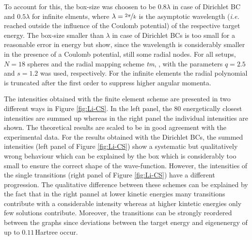 To account for this, the box-size was choosen to be $0.8\lambda$ in case of Dirichlet BC and $0.5\lambda$ for infinite elments, where $\lambda=\nicefrac{2\pi}{k}$ is the asymptotic wavelength (\textit{i.e.} reached outside the influence of the Coulomb potential) of the respective target energy.
The box-size smaller than $\lambda$ in case of Dirichlet BCs is too small for a reasonable error in energy but show, since the wavelength is considerably smaller in the presence of a Coulomb potential, still some radial nodes.
For all setups, $N=18$ spheres and the radial mapping scheme \textit{tm}, , with the parameters $q=2.5$ and $s=1.2$ was used, respectively.
For the infinite elements the radial polynomial is truncated after the first order to suppress higher angular momenta.

The intensities obtained with the finite element scheme are presented in two different ways in Figure \ref{fig:Li-CS}.
In the left panel, the $80$ energetically closest intensities are summed up whereas in the right panel the individual intensities are shown.
The theoretical results are scaled to be in good agreement with the experimental data.
For the results obtained with the Dirichlet BCs, the summed intensities (left panel of Figure \ref{fig:Li-CS}) show a systematic but qualitatively wrong behaviour which can be explained by the box which is considerably too small to ensure the correct shape of the wave-function.
However, the intensities of the single transitions (right panel of Figure \ref{fig:Li-CS}) have a different progression.
The qualitative difference between these schemes can be explained by the fact that in the right pannel at lower kinetic energies many transitions contribute with a considerable intensity whereas at higher kintetic energies only few solutions contribute.
Moreover, the transitions can be strongly reordered between the graphs since deviations between the target energy and eigenenergy of up to $0.11\,$Hartree occur.

